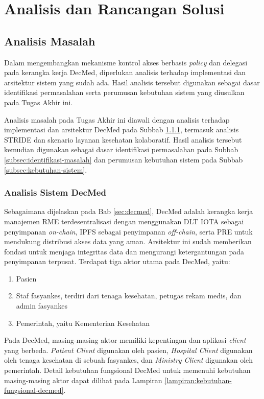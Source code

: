 \documentclass[bahasa, 12pt, a4paper, onecolumn, oneside, final]{report}
\begin{document}
\chapter{Analisis dan Rancangan Solusi}
\label{chap:analisis-dan-rancangan}

\section{Analisis Masalah}
\label{sec:analisis-masalah}

Dalam mengembangkan mekanisme kontrol akses berbasis \textit{policy} dan delegasi pada kerangka kerja DecMed, diperlukan analisis terhadap implementasi dan arsitektur sistem yang sudah ada. Hasil analisis tersebut digunakan sebagai dasar identifikasi permasalahan serta perumusan kebutuhan sistem yang diusulkan pada Tugas Akhir ini.

Analisis masalah pada Tugas Akhir ini diawali dengan analisis terhadap implementasi dan arsitektur DecMed pada Subbab \ref{subsec:analisis-sistem-decmed}, termasuk analisis STRIDE dan skenario layanan kesehatan kolaboratif. Hasil analisis tersebut kemudian digunakan sebagai dasar identifikasi permasalahan pada Subbab \ref{subsec:identifikasi-masalah} dan perumusan kebutuhan sistem pada Subbab \ref{subsec:kebutuhan-sistem}.

\subsection{Analisis Sistem DecMed}
\label{subsec:analisis-sistem-decmed}

Sebagaimana dijelaskan pada Bab \ref{sec:decmed}, DecMed adalah kerangka kerja manajemen RME terdesentralisasi dengan menggunakan DLT IOTA sebagai penyimpanan \textit{on-chain}, IPFS sebagai penyimpanan \textit{off-chain}, serta PRE untuk mendukung distribusi akses data yang aman. Arsitektur ini sudah memberikan fondasi untuk menjaga integritas data dan mengurangi ketergantungan pada penyimpanan terpusat. Terdapat tiga aktor utama pada DecMed, yaitu:

\begin{enumerate}
	\item Pasien
	\item Staf fasyankes, terdiri dari tenaga kesehatan, petugas rekam medis, dan admin fasyankes
	\item Pemerintah, yaitu Kementerian Kesehatan
\end{enumerate}

Pada DecMed, masing-masing aktor memiliki kepentingan dan aplikasi \textit{client} yang berbeda. \textit{Patient Client} digunakan oleh pasien, \textit{Hospital Client} digunakan oleh tenaga kesehatan di sebuah fasyankes, dan \textit{Ministry Client} digunakan oleh pemerintah. Detail kebutuhan fungsional DecMed untuk memenuhi kebutuhan masing-masing aktor dapat dilihat pada Lampiran \ref{lampiran:kebutuhan-fungsional-decmed}.
\end{document}
